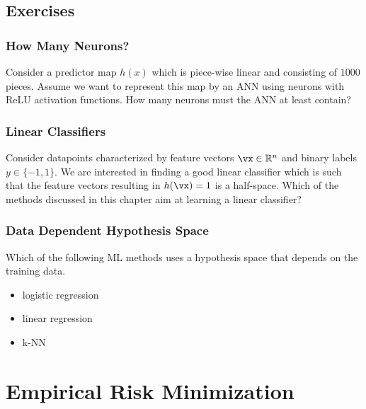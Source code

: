\documentclass[12pt]{report}
\begin{document}
\section{Exercises}

\subsection{How Many Neurons?} 
\label{exercise_how_many_neurons} 
Consider a predictor map $h(x)$ which is piece-wise linear and consisting 
of $1000$ pieces. Assume we want to represent this map by an ANN using 
neurons with ReLU activation functions. How many neurons must the ANN 
at least contain?

\subsection{Linear Classifiers} 
\label{exercise_linear_classifier} 
Consider datapoints characterized by feature vectors $\vx \in \mathbb{R}^{n}$ and 
binary labels $y \in\{-1,1\}$. We are interested in finding a good linear classifier which is such that 
the feature vectors resulting in $h(\vx) = 1$ is a half-space. Which of the methods 
discussed in this chapter aim at learning a linear classifier?


\subsection{Data Dependent Hypothesis Space} 
\label{exercise_data_dep_hypospace} 
Which of the following ML methods uses a hypothesis space that 
depends on the training data. 
\begin{itemize} 
	\item logistic regression 
	\item linear regression 
	\item k-NN 
\end{itemize}


\newpage
\chapter{Empirical Risk Minimization}
\label{ch_Optimization}
\end{document}
